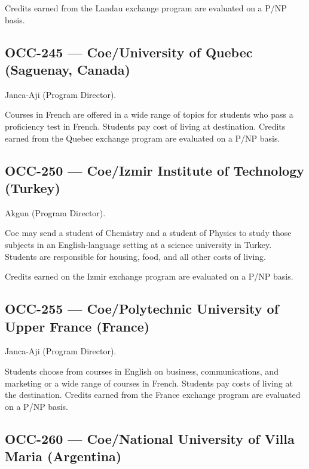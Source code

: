 \documentclass[
  letterpaper,
]{scrbook}
\begin{document}
Credits earned from the Landau exchange program are evaluated on a P/NP
basis.

\hypertarget{occ-245-coeuniversity-of-quebec-saguenay-canada}{%
\subsection{OCC-245 --- Coe/University of Quebec (Saguenay,
Canada)}\label{occ-245-coeuniversity-of-quebec-saguenay-canada}}

Janca-Aji (Program Director).

Courses in French are offered in a wide range of topics for students who
pass a proficiency test in French. Students pay cost of living at
destination. Credits earned from the Quebec exchange program are
evaluated on a P/NP basis.

\hypertarget{occ-250-coeizmir-institute-of-technology-turkey}{%
\subsection{OCC-250 --- Coe/Izmir Institute of Technology
(Turkey)}\label{occ-250-coeizmir-institute-of-technology-turkey}}

Akgun (Program Director).

Coe may send a student of Chemistry and a student of Physics to study
those subjects in an English-language setting at a science university in
Turkey. Students are responsible for housing, food, and all other costs
of living.

Credits earned on the Izmir exchange program are evaluated on a P/NP
basis.

\hypertarget{occ-255-coepolytechnic-university-of-upper-france-france}{%
\subsection{OCC-255 --- Coe/Polytechnic University of Upper France
(France)}\label{occ-255-coepolytechnic-university-of-upper-france-france}}

Janca-Aji (Program Director).

Students choose from courses in English on business, communications, and
marketing or a wide range of courses in French. Students pay costs of
living at the destination. Credits earned from the France exchange
program are evaluated on a P/NP basis.

\hypertarget{occ-260-coenational-university-of-villa-maria-argentina}{%
\subsection{OCC-260 --- Coe/National University of Villa Maria
(Argentina)}\label{occ-260-coenational-university-of-villa-maria-argentina}}
\end{document}

